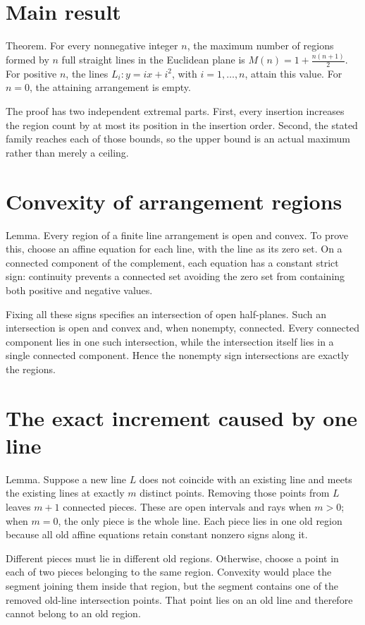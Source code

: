 \documentclass[11pt]{article}
\begin{document}
\section{Main result}
Theorem. For every nonnegative integer $n$, the maximum number of regions formed by $n$ full straight lines in the Euclidean plane is
$M(n)=1+\frac{n(n+1)}{2}$. For positive $n$, the lines $L_i:y=ix+i^2$, with $i=1,\ldots,n$, attain this value. For $n=0$, the attaining arrangement is empty.

The proof has two independent extremal parts. First, every insertion increases the region count by at most its position in the insertion order. Second, the stated family reaches each of those bounds, so the upper bound is an actual maximum rather than merely a ceiling.

\section{Convexity of arrangement regions}
Lemma. Every region of a finite line arrangement is open and convex. To prove this, choose an affine equation for each line, with the line as its zero set. On a connected component of the complement, each equation has a constant strict sign: continuity prevents a connected set avoiding the zero set from containing both positive and negative values.

Fixing all these signs specifies an intersection of open half-planes. Such an intersection is open and convex and, when nonempty, connected. Every connected component lies in one such intersection, while the intersection itself lies in a single connected component. Hence the nonempty sign intersections are exactly the regions.

\section{The exact increment caused by one line}
Lemma. Suppose a new line $L$ does not coincide with an existing line and meets the existing lines at exactly $m$ distinct points. Removing those points from $L$ leaves $m+1$ connected pieces. These are open intervals and rays when $m>0$; when $m=0$, the only piece is the whole line. Each piece lies in one old region because all old affine equations retain constant nonzero signs along it.

Different pieces must lie in different old regions. Otherwise, choose a point in each of two pieces belonging to the same region. Convexity would place the segment joining them inside that region, but the segment contains one of the removed old-line intersection points. That point lies on an old line and therefore cannot belong to an old region.
\end{document}
